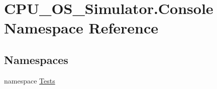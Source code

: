 \hypertarget{namespace_c_p_u___o_s___simulator_1_1_console}{}\section{C\+P\+U\+\_\+\+O\+S\+\_\+\+Simulator.\+Console Namespace Reference}
\label{namespace_c_p_u___o_s___simulator_1_1_console}
\subsection*{Namespaces}
\begin{DoxyCompactItemize}
\item 
namespace \hyperlink{namespace_c_p_u___o_s___simulator_1_1_console_1_1_tests}{Tests}
\end{DoxyCompactItemize}
